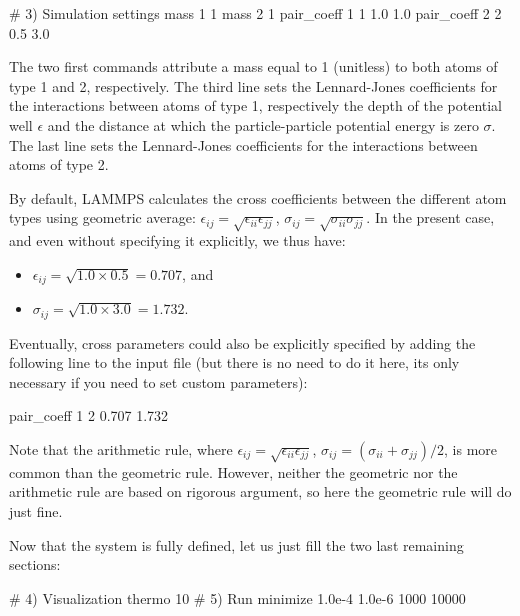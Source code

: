 \begin{lcverbatim}
# 3) Simulation settings
mass 1 1
mass 2 1
pair_coeff 1 1 1.0 1.0
pair_coeff 2 2 0.5 3.0
\end{lcverbatim}

\noindent The two first commands attribute a mass
equal to 1 (unitless) to both atoms of type 1 and 2,
respectively. The third line sets the Lennard-Jones
coefficients for the interactions between atoms of type 1,
respectively the depth of the potential well
$\epsilon$ and the distance at which the
particle-particle potential energy is zero $\sigma$. 
The last line sets the Lennard-Jones coefficients for
the interactions between atoms of type 2.

\begin{tcolorbox}[colback=mylightblue!5!white,colframe=mylightblue!75!black,title=About cross parameters]
By default, LAMMPS calculates the cross coefficients between the different atom types
using geometric average: 
$\epsilon_{ij} = \sqrt{\epsilon_{ii} \epsilon_{jj}}$,
$\sigma_{ij} = \sqrt{\sigma_{ii} \sigma_{jj}}$. 
In the present case, and even without specifying it explicitly, we thus have:
\begin{itemize}
\item $\epsilon_{ij} = \sqrt{1.0 \times 0.5} = 0.707$, and 
\item $\sigma_{ij} = \sqrt{1.0 \times 3.0} = 1.732$.
\end{itemize}
Eventually, cross parameters could also be explicitly specified by adding the following 
line to the input file (but there is no need to do it here, its only necessary if you need 
to set custom parameters):
\begin{lcverbatim}

pair_coeff 1 2 0.707 1.732 
\end{lcverbatim}

\noindent Note that the arithmetic rule, where 
$\epsilon_{ij} = \sqrt{\epsilon_{ii} \epsilon_{jj}}$,
$\sigma_{ij} = (\sigma_{ii}+\sigma_{jj})/2$, 
is more common than the geometric rule. However, neither the geometric nor the
arithmetic rule are based on rigorous argument, so here
the geometric rule will do just fine. 
\end{tcolorbox}

Now that the system is fully defined, let us just fill the two last remaining sections:

\begin{lcverbatim}
# 4) Visualization
thermo 10
# 5) Run
minimize 1.0e-4 1.0e-6 1000 10000
\end{lcverbatim}

